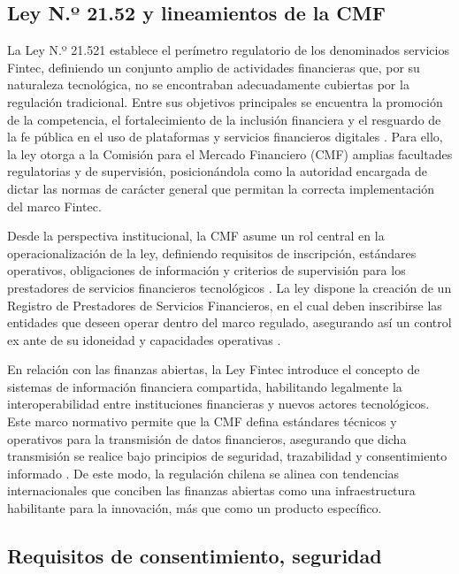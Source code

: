 \documentclass[
	spanish, %
	letterpaper, oneside
]{book}
\begin{document}
\subsection{Ley N.º 21.52 y lineamientos de la CMF}

La Ley N.º 21.521 establece el perímetro regulatorio de los denominados servicios Fintec, definiendo un conjunto amplio de actividades financieras que, por su naturaleza tecnológica, no se encontraban adecuadamente cubiertas por la regulación tradicional. Entre sus objetivos principales se encuentra la promoción de la competencia, el fortalecimiento de la inclusión financiera y el resguardo de la fe pública en el uso de plataformas y servicios financieros digitales \cite{ley21521}. Para ello, la ley otorga a la Comisión para el Mercado Financiero (CMF) amplias facultades regulatorias y de supervisión, posicionándola como la autoridad encargada de dictar las normas de carácter general que permitan la correcta implementación del marco Fintec.

Desde la perspectiva institucional, la CMF asume un rol central en la operacionalización de la ley, definiendo requisitos de inscripción, estándares operativos, obligaciones de información y criterios de supervisión para los prestadores de servicios financieros tecnológicos \cite{cmf_fintech}. La ley dispone la creación de un Registro de Prestadores de Servicios Financieros, en el cual deben inscribirse las entidades que deseen operar dentro del marco regulado, asegurando así un control ex ante de su idoneidad y capacidades operativas \cite{ley21521}.

En relación con las finanzas abiertas, la Ley Fintec introduce el concepto de sistemas de información financiera compartida, habilitando legalmente la interoperabilidad entre instituciones financieras y nuevos actores tecnológicos. Este marco normativo permite que la CMF defina estándares técnicos y operativos para la transmisión de datos financieros, asegurando que dicha transmisión se realice bajo principios de seguridad, trazabilidad y consentimiento informado \cite{cmf_fintech}. De este modo, la regulación chilena se alinea con tendencias internacionales que conciben las finanzas abiertas como una infraestructura habilitante para la innovación, más que como un producto específico.

\subsection{Requisitos de consentimiento, seguridad}
\end{document}
